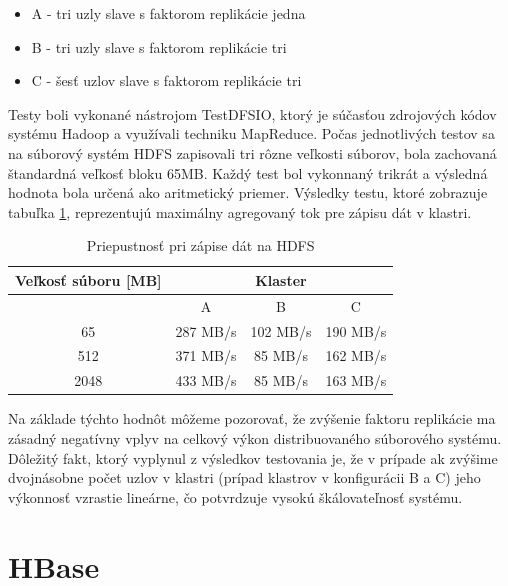 \documentclass[11pt,twoside,a4paper]{book}
\begin{document}
\begin{itemize}
 \item A - tri uzly slave s faktorom replikácie jedna
 \item B - tri uzly slave s faktorom replikácie tri
 \item C - šesť uzlov slave s faktorom replikácie tri
\end{itemize}

Testy boli vykonané nástrojom TestDFSIO, ktorý je súčasťou zdrojových kódov systému Hadoop a využívali techniku MapReduce. Počas jednotlivých testov sa na súborový systém HDFS zapisovali tri rôzne veľkosti súborov, bola zachovaná štandardná veľkosť bloku 65MB. Každý test bol vykonnaný trikrát a výsledná hodnota bola určená ako aritmetický priemer. Výsledky testu, ktoré zobrazuje tabuľka \ref{tab:HDFSperformance}, reprezentujú maximálny agregovaný tok pre zápisu dát v klastri.

\begin{table}[hp]
\begin{center}
\begin{tabular}{|c|c|c|c|}
\hline 
\multirow{2}{*}{Veľkosť súboru [MB]} & \multicolumn{3}{|c|}{Klaster}  \\
\hline & A & B & C\\
\hline 65 & 287 MB/s& 102 MB/s& 190 MB/s\\ 
\hline 512 & 371 MB/s& 85 MB/s& 162 MB/s\\ 
\hline 2048 & 433 MB/s& 85 MB/s& 163 MB/s\\ 
\hline
\end{tabular} 
\end{center}
\caption{Priepustnosť pri zápise dát na HDFS}
\label{tab:HDFSperformance}
\end{table}


Na základe týchto hodnôt môžeme pozorovať, že zvýšenie faktoru replikácie ma zásadný negatívny vplyv na celkový výkon distribuovaného súborového systému. Dôležitý fakt, ktorý vyplynul z výsledkov testovania je, že v prípade ak zvýšime dvojnásobne počet uzlov v klastri (prípad klastrov v konfigurácii B a C) jeho výkonnosť vzrastie lineárne, čo potvrdzuje vysokú škálovateľnosť systému. 


\section{HBase}
\end{document}
